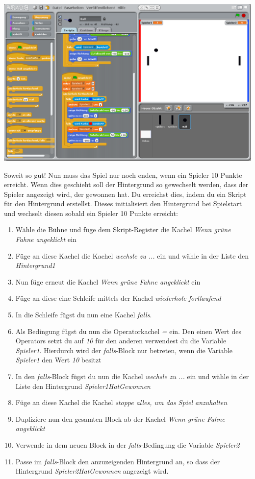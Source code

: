 \includegraphics[width=1\textwidth]{images/aufgabe5_pong_spieler_variablen_2.png}


Soweit so gut! Nun muss das Spiel nur noch enden, wenn ein Spieler 10 Punkte erreicht. Wenn dies geschieht soll der Hintergrund so gewechselt werden, dass der Spieler angezeigt wird, der gewonnen hat. 
Du erreichst dies, indem du ein Skript für den Hintergrund erstellst. Dieses initialisiert den Hintergrund bei Spielstart und wechselt diesen sobald ein Spieler 10 Punkte erreicht:

\begin{enumerate}\addtocounter{enumi}{18}
\item Wähle die Bühne und füge dem Skript-Register die Kachel \textit{Wenn grüne Fahne angeklickt} ein
\item Füge an diese Kachel die Kachel \textit{wechsle zu ...} ein und wähle in der Liste den \emph{Hintergrund1}
\item Nun füge erneut die Kachel \textit{Wenn grüne Fahne angeklickt} ein
\item Füge an diese eine Schleife mittels der Kachel \textit{wiederhole fortlaufend}
\item In die Schleife fügst du nun eine Kachel \textit{falls}. 
\item Als Bedingung fügst du nun die Operatorkachel \textit{=} ein. Den einen Wert des Operators setzt du auf \emph{10} für den anderen verwendest du die Variable \textit{Spieler1}. Hierdurch wird der \textit{falls}-Block nur betreten, wenn die Variable \textit{Spieler1} den Wert \emph{10} besitzt
\item In den \textit{falls}-Block fügst du nun die Kachel \textit{wechsle zu ...} ein und wähle in der Liste den Hintergrund \emph{Spieler1HatGewonnen}
\item Füge an diese Kachel die Kachel \textit{stoppe alles, um das Spiel anzuhalten}
\item Dupliziere nun den gesamten Block ab der Kachel \textit{Wenn grüne Fahne angeklickt} 
\item Verwende in dem neuen Block in der \textit{falls}-Bedingung die Variable \textit{Spieler2}
\item Passe im  \textit{falls}-Block den anzuzeigenden Hintergrund an, so dass der Hintergrund \textit{Spieler2HatGewonnen} angezeigt wird.
\end{enumerate}

